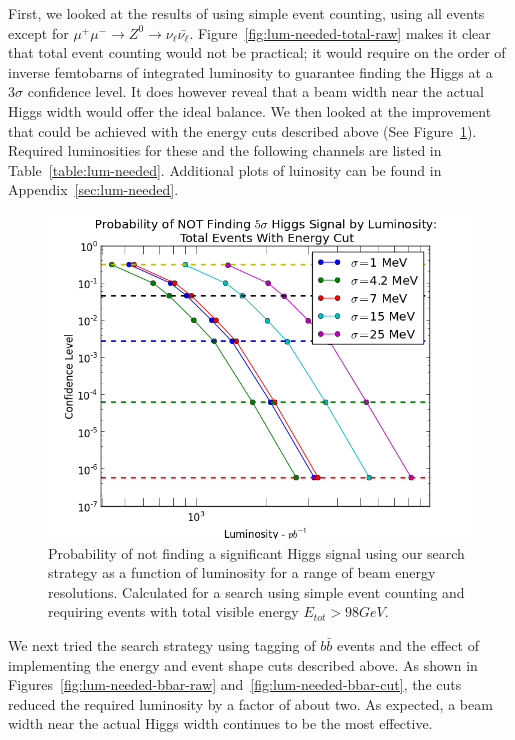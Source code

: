 \documentclass[a4paper]{article}
\begin{document}
	First, we looked at the results of using simple event counting, using all events except for $\mu^+\mu^- \rightarrow Z^0 \rightarrow \nu_{\ell} \bar{\nu_\ell}$. Figure~\ref{fig:lum-needed-total-raw} makes it clear that total event counting would not be practical; it would require on the order of inverse femtobarns of integrated luminosity to guarantee finding the Higgs at a $3\sigma$ confidence level. It does however reveal that a beam width near the actual Higgs width would offer the ideal balance. We then looked at the improvement that could be achieved with the energy cuts described above (See Figure~\ref{fig:lum-needed-total-cut}). Required luminosities for these and the following channels are listed in Table~\ref{table:lum-needed}. Additional plots of luinosity can be found in Appendix~\ref{sec:lum-needed}.

	\begin{figure}
		\includegraphics[width=\textwidth]{lum-needed-total-cut}
		\caption{Probability of not finding a significant Higgs signal using our search strategy as a function of luminosity for a range of beam energy resolutions. Calculated for a search using simple event counting and requiring events with total visible energy $E_{tot} > 98 GeV$.\label{fig:lum-needed-total-cut}}
	\end{figure}

	We next tried the search strategy using tagging of $b\bar{b}$ events and the effect of implementing the energy and event shape cuts described above. As shown in Figures~\ref{fig:lum-needed-bbar-raw} and~\ref{fig:lum-needed-bbar-cut}, the cuts reduced the required luminosity by a factor of about two. As expected, a beam width near the actual Higgs width continues to be the most effective.
\end{document}

